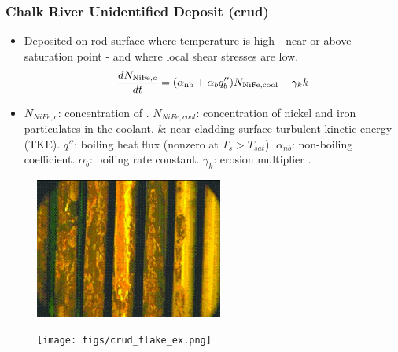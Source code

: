 \documentclass[t, pdftex]{beamer}
\begin{document}
\begin{frame}
\frametitle{Chalk River Unidentified Deposit (crud)}
\vspace{-12pt}
\begin{scriptsize}
    \begin{itemize}
        \item Deposited on rod surface where temperature is high - near or above saturation point - and where local shear stresses are low.      
        \[
        \frac{d N_{\mathrm{\ce{NiFe}},c}}{dt} = (\alpha_{\mathrm{nb}} + \alpha_{b}q''_{b} )N_{\mathrm{\ce{NiFe}}, \mathrm{cool}} - \gamma_k k
        \]
        \item $N_{NiFe,c}$: concentration of . $N_{NiFe,cool}$: concentration of nickel and iron particulates in the coolant.  $k$: near-cladding surface turbulent kinetic energy (TKE).  $q''$: boiling heat flux (nonzero at $T_s>T_{sat}$).  $\alpha_{nb}$: non-boiling coefficient. $\alpha_b$: boiling rate constant.  $\gamma_k$: erosion multiplier \cite{mongoose17}.
        
    \end{itemize}
\end{scriptsize}

\vspace{-12pt}
\begin{figure}
    \centering
    \begin{minipage}{.5\textwidth}
        \centering
        \includegraphics[width=0.55\textwidth]{figs/crud-crud.jpg}
    \end{minipage}%
    \begin{minipage}{.5\textwidth}
        \centering
        \texttt{[image: figs/crud\_flake\_ex.png]}
    \end{minipage}
\end{figure}
\end{frame}

\end{document}
